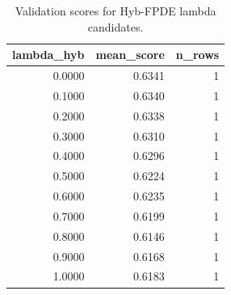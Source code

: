 \begin{table}[t]
\caption{Validation scores for Hyb-FPDE lambda candidates.}
\label{tab:lambda_distribution_computed}
\centering
\begin{tabular}{rrr}
\toprule
lambda\_hyb & mean\_score & n\_rows \\
\midrule
0.0000 & 0.6341 & 1 \\
0.1000 & 0.6340 & 1 \\
0.2000 & 0.6338 & 1 \\
0.3000 & 0.6310 & 1 \\
0.4000 & 0.6296 & 1 \\
0.5000 & 0.6224 & 1 \\
0.6000 & 0.6235 & 1 \\
0.7000 & 0.6199 & 1 \\
0.8000 & 0.6146 & 1 \\
0.9000 & 0.6168 & 1 \\
1.0000 & 0.6183 & 1 \\
\bottomrule
\end{tabular}

\end{table}
